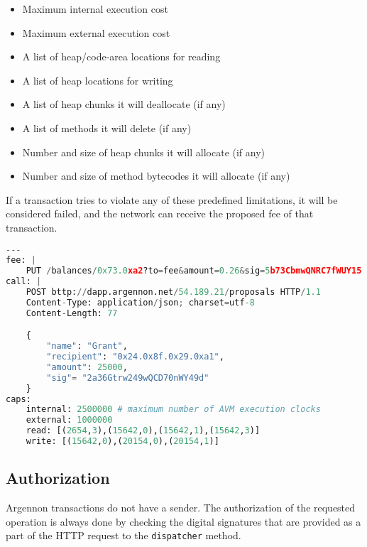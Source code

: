 \begin{itemize}
    \item Maximum internal execution cost
    \item Maximum external execution cost
    \item A list of heap/code-area locations for reading
    \item A list of heap locations for writing
    \item A list of heap chunks it will deallocate (if any)
    \item A list of methods it will delete (if any)
    \item Number and size of heap chunks it will allocate (if any)
    \item Number and size of method bytecodes it will allocate (if any)
\end{itemize}

If a transaction tries to violate any of these predefined limitations, it will be considered failed, and the network
can receive the proposed fee of that transaction.

\begin{lstlisting}[language=python, frame=TB, float, title=An Argennon transaction in YAML format,label={lst:txn-example}]
---
fee: |
    PUT /balances/0x73.0xa2?to=fee&amount=0.26&sig=5b73CbmwQNRC7fWUY15 HTTP/1.1
call: |
    POST bttp://dapp.argennon.net/54.189.21/proposals HTTP/1.1
    Content-Type: application/json; charset=utf-8
    Content-Length: 77

    {
        "name": "Grant",
        "recipient": "0x24.0x8f.0x29.0xa1",
        "amount": 25000,
        "sig"= "2a36Gtrw249wQCD70nWY49d"
    }
caps:
    internal: 2500000 # maximum number of AVM execution clocks
    external: 1000000
    read: [(2654,3),(15642,0),(15642,1),(15642,3)]
    write: [(15642,0),(20154,0),(20154,1)]
\end{lstlisting}

\subsection{Authorization}\label{subsec:txn-auth}

Argennon transactions do not have a sender. The authorization of the requested operation is always done by checking the
digital signatures that are provided as a part of the HTTP request to the \texttt{dispatcher} method.

